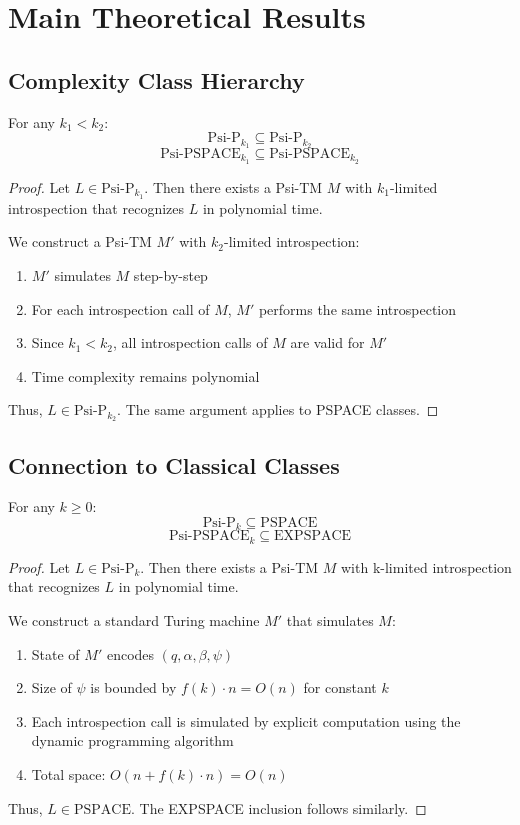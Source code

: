 \section{Main Theoretical Results}

\subsection{Complexity Class Hierarchy}

\begin{theorem}
For any $k_1 < k_2$:
$$\text{Psi-P}_{k_1} \subseteq \text{Psi-P}_{k_2}$$
$$\text{Psi-PSPACE}_{k_1} \subseteq \text{Psi-PSPACE}_{k_2}$$
\end{theorem}

\begin{proof}
Let $L \in \text{Psi-P}_{k_1}$. Then there exists a Psi-TM $M$ with $k_1$-limited introspection that recognizes $L$ in polynomial time.

We construct a Psi-TM $M'$ with $k_2$-limited introspection:
\begin{enumerate}
\item $M'$ simulates $M$ step-by-step
\item For each introspection call of $M$, $M'$ performs the same introspection
\item Since $k_1 < k_2$, all introspection calls of $M$ are valid for $M'$
\item Time complexity remains polynomial
\end{enumerate}

Thus, $L \in \text{Psi-P}_{k_2}$. The same argument applies to PSPACE classes.
\end{proof}

\subsection{Connection to Classical Classes}

\begin{theorem}
For any $k \geq 0$:
$$\text{Psi-P}_k \subseteq \text{PSPACE}$$
$$\text{Psi-PSPACE}_k \subseteq \text{EXPSPACE}$$
\end{theorem}

\begin{proof}
Let $L \in \text{Psi-P}_k$. Then there exists a Psi-TM $M$ with k-limited introspection that recognizes $L$ in polynomial time.

We construct a standard Turing machine $M'$ that simulates $M$:
\begin{enumerate}
\item State of $M'$ encodes $(q, \alpha, \beta, \psi)$
\item Size of $\psi$ is bounded by $f(k) \cdot n = O(n)$ for constant $k$
\item Each introspection call is simulated by explicit computation using the dynamic programming algorithm
\item Total space: $O(n + f(k) \cdot n) = O(n)$
\end{enumerate}

Thus, $L \in \text{PSPACE}$. The EXPSPACE inclusion follows similarly.
\end{proof}

